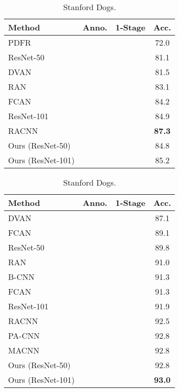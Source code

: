 \documentclass[runningheads]{llncs}
\begin{document}
\begin{table}[p]
\begin{minipage}[p]{0.48\linewidth}
\begin{subtable}[t]{\textwidth}
\begin{tabular}{lccc}
	\toprule
          Method & Anno. & 1-Stage & Acc.\\
	\midrule
	PDFR \cite{zhang2016picking} &  &  & 72.0\\
	ResNet-50 \cite{he2016deep} &  & \checkmark & 81.1\\
	DVAN \cite{zhao2016diversified} &  &  & 81.5\\
	RAN \cite{wang2017residual} &  &  & 83.1\\
	FCAN \cite{liu2016fully} &  & \checkmark & 84.2\\
	ResNet-101 \cite{he2016deep} &  & \checkmark & 84.9\\
	RACNN \cite{fu2017look} &  &  & \bf87.3\\
	\midrule
	Ours (ResNet-50) &  & \checkmark & 84.8\\
	Ours (ResNet-101) &  & \checkmark & 85.2\\
	\bottomrule
	\end{tabular}
        \caption{Stanford Dogs.}
        \label{table:results_stanford_dogs}
      \end{subtable}
 \end{minipage}
 \begin{minipage}[p]{0.48\linewidth}
      \centering
      \begin{subtable}[t]{\textwidth}
	\begin{tabular}{lccc}
	\toprule
         Method & Anno. & 1-Stage & Acc.\\
	\midrule
	DVAN \cite{zhao2016diversified} &  &  & 87.1\\
	FCAN \cite{liu2016fully} &  & \checkmark & 89.1\\
	ResNet-50 \cite{he2016deep} &  & \checkmark & 89.8\\
	RAN \cite{wang2017residual} &  &  & 91.0\\
	B-CNN \cite{lin2015bilinear} &  &  & 91.3\\
	FCAN \cite{liu2016fully} & \checkmark & \checkmark & 91.3\\
	ResNet-101 \cite{he2016deep} &  & \checkmark & 91.9\\
	RACNN \cite{fu2017look} &  &  & 92.5\\
	PA-CNN \cite{krause2015fine} & \checkmark & \checkmark & 92.8\\
	MACNN \cite{zheng2017learning} &  & \checkmark & 92.8\\
	\midrule
	Ours (ResNet-50) &  & \checkmark & 92.8\\
	Ours (ResNet-101) &  & \checkmark & \bf93.0\\

\end{tabular}
\end{subtable}
\end{minipage}
\end{table}
\end{document}
